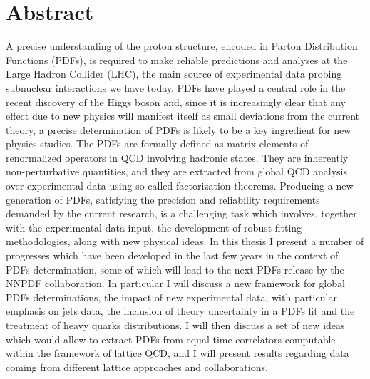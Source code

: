 \chapter*{Abstract}
A precise understanding of the proton structure, encoded in Parton Distribution Functions (PDFs), is required 
to make reliable predictions and analyses at the Large Hadron Collider (LHC), 
the main source of experimental data probing subnuclear interactions we have today.
PDFs have played a central role in the recent 
discovery of the Higgs boson and, since it is increasingly clear that any effect due to new physics 
will manifest itself as small deviations from the current theory, 
a precise determination of PDFs is likely to be a key ingredient 
for new physics studies.
%
The PDFs are formally defined as matrix elements of renormalized operators in QCD involving hadronic states.
They are inherently non-perturbative quantities, and they are extracted from global QCD analysis over
experimental data using so-called factorization theorems. 
Producing a new generation of PDFs, satisfying the precision and reliability requirements demanded by the current research,
is a challenging task which involves, together with the experimental data input, the development of robust
fitting methodologies, along with new physical ideas. 
%
In this thesis I present a number of progresses which have been developed in the last few years in the context of 
PDFs determination, some of which will lead to the next PDFs release by the NNPDF collaboration. 
In particular I will discuss a new framework for global PDFs determinations, the impact of new experimental data,
with particular emphasis on jets data, the inclusion of theory uncertainty in a PDFs fit 
and the treatment of heavy quarks distributions.
%
I will then discuss a set of new ideas which would allow to extract PDFs from equal time correlators computable 
within the framework of lattice QCD, and I will present results regarding data coming from different 
lattice approaches and collaborations.

